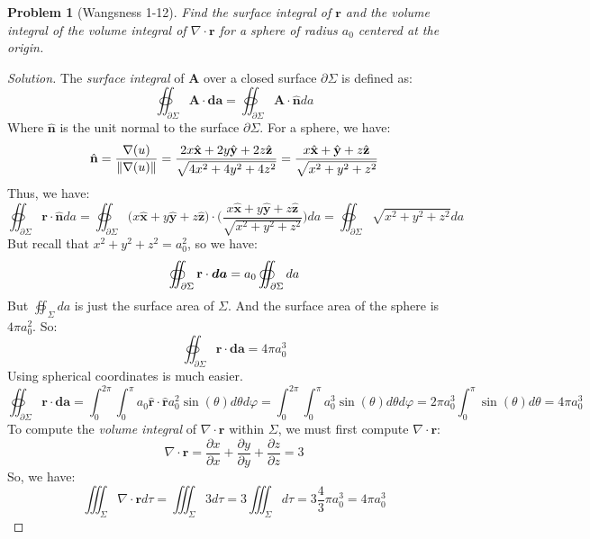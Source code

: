 \documentclass{article}
\theoremstyle{mystyle}
\newtheorem{problem}{Problem}[section]
\begin{document}
\begin{problem}[Wangsness 1-12]
\label{problem:EMAG_1_wangsness_1_12}
Find the surface integral of $\mathbf{r}$ and the volume integral of the volume integral of $\nabla \cdot \mathbf{r}$ for a sphere of radius $a_{0}$ centered at the origin.
\end{problem}
\begin{proof}[Solution]
The \textit{surface integral} of $\mathbf{A}$ over a closed surface $\partial\Sigma$ is defined as:
\begin{equation*}
    \oiint_{\partial\Sigma} \mathbf{A}\cdot\boldsymbol{da} = \oiint_{\partial\Sigma}\mathbf{A}\cdot\hat{\boldsymbol{n}}da
\end{equation*}
Where $\hat{\mathbf{n}}$ is the unit normal to the surface $\partial\Sigma$. For a sphere, we have:
\begin{equation*}
    \hat{\mathbf{n}}=\frac{\nabla(u)}{\norm{\nabla(u)}}=\frac{2x\hat{\mathbf{x}}+2y\hat{\mathbf{y}}+2z\hat{\mathbf{z}}}{\sqrt{4x^{2}+4y^{2}+4z^{2}}}= \frac{x\hat{\mathbf{x}}+\hat{\mathbf{y}}+z\hat{\mathbf{z}}}{\sqrt{x^2+y^2+z^2}}
\end{equation*}
Thus, we have:
\begin{equation*}
    \oiint_{\partial\Sigma}\mathbf{r}\cdot\hat{\mathbf{n}}da=\oiint_{\partial\Sigma}\bigg(x\hat{\mathbf{x}}+y\hat{\mathbf{y}}+z\hat{\mathbf{z}}\bigg)\cdot \bigg(\frac{x\hat{\mathbf{x}}+y\hat{\mathbf{y}}+z\hat{\mathbf{z}}}{\sqrt{x^{2}+y^{2}+z^{2}}}\bigg)da=\oiint_{\partial\Sigma}\sqrt{x^{2}+y^{2}+z^{2}}da
\end{equation*}
But recall that $x^{2}+y^{2}+z^{2} = a_{0}^{2}$, so we have:
\begin{equation*}
    \oiint_{\partial\Sigma}\mathbf{r}\cdot\boldsymbol{da} = a_{0}\oiint_{\partial\Sigma}da\\
\end{equation*}
But $\oiint_{\Sigma}da$ is just the surface area of $\Sigma$. And the surface area of the sphere is $4\pi a_{0}^{2}$. So:
\begin{equation*}
    \oiint_{\partial\Sigma}\mathbf{r}\cdot \boldsymbol{da} = 4\pi a_{0}^{3}
\end{equation*}
Using spherical coordinates is much easier.
\begin{equation*}
    \oiint_{\partial\Sigma}\mathbf{r}\cdot\boldsymbol{da}=\int_{0}^{2\pi}\int_{0}^{\pi}a_{0}\hat{\mathbf{r}}\cdot\hat{\mathbf{r}}a_{0}^{2}\sin(\theta)d\theta d\varphi= \int_{0}^{2\pi}\int_{0}^{\pi}a_{0}^{3}\sin(\theta)d\theta d\varphi=2\pi a_{0}^{3} \int_{0}^{\pi}\sin(\theta)d\theta=4\pi a_{0}^{3}
\end{equation*}
To compute the \textit{volume integral} of $\nabla \cdot \mathbf{r}$ within $\Sigma$, we must first compute $\nabla\cdot \mathbf{r}$:
\begin{equation*}
    \nabla\cdot\mathbf{r}=\frac{\partial x}{\partial x}+\frac{\partial y}{\partial y}+\frac{\partial z}{\partial z}=3
\end{equation*}
So, we have:
\begin{equation*}
    \iiint_{\Sigma}\nabla\cdot\mathbf{r}d\tau=\iiint_{\Sigma}3d\tau=3\iiint_{\Sigma}d\tau=3\frac{4}{3}\pi a_{0}^{3}=4\pi a_{0}^{3}
\end{equation*}
\end{proof}
\end{document}
